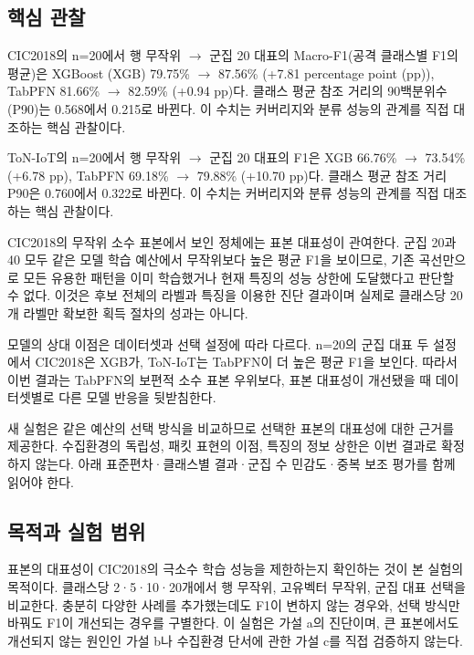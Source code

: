 

\subsection{핵심 관찰}
CIC2018의 n=\allowbreak{}20에서 행 무작위  \ensuremath{\rightarrow}  군집 20 대표의 Macro-F1(공격 클래스별 F1의 평균)은 XGBoost (XGB) 79.75\%  \ensuremath{\rightarrow}  87.56\% (+\allowbreak{}7.81 percentage point (pp)), TabPFN 81.66\%  \ensuremath{\rightarrow}  82.59\% (+\allowbreak{}0.94 pp)다. 클래스 평균 참조 거리의 90백분위수 (P90)는 0.568에서 0.215로 바뀐다. 이 수치는 커버리지와 분류 성능의 관계를 직접 대조하는 핵심 관찰이다.

ToN-IoT의 n=\allowbreak{}20에서 행 무작위  \ensuremath{\rightarrow}  군집 20 대표의 F1은 XGB 66.76\%  \ensuremath{\rightarrow}  73.54\% (+\allowbreak{}6.78 pp), TabPFN 69.18\%  \ensuremath{\rightarrow}  79.88\% (+\allowbreak{}10.70 pp)다. 클래스 평균 참조 거리 P90은 0.760에서 0.322로 바뀐다. 이 수치는 커버리지와 분류 성능의 관계를 직접 대조하는 핵심 관찰이다.

CIC2018의 무작위 소수 표본에서 보인 정체에는 표본 대표성이 관여한다. 군집 20과 40 모두 같은 모델 학습 예산에서 무작위보다 높은 평균 F1을 보이므로, 기존 곡선만으로 모든 유용한 패턴을 이미 학습했거나 현재 특징의 성능 상한에 도달했다고 판단할 수 없다. 이것은 후보 전체의 라벨과 특징을 이용한 진단 결과이며 실제로 클래스당 20개 라벨만 확보한 획득 절차의 성과는 아니다.

모델의 상대 이점은 데이터셋과 선택 설정에 따라 다르다. n=\allowbreak{}20의 군집 대표 두 설정에서 CIC2018은 XGB가, ToN-IoT는 TabPFN이 더 높은 평균 F1을 보인다. 따라서 이번 결과는 TabPFN의 보편적 소수 표본 우위보다, 표본 대표성이 개선됐을 때 데이터셋별로 다른 모델 반응을 뒷받침한다.

새 실험은 같은 예산의 선택 방식을 비교하므로 선택한 표본의 대표성에 대한 근거를 제공한다. 수집환경의 독립성, 패킷 표현의 이점, 특징의 정보 상한은 이번 결과로 확정하지 않는다. 아래 표준편차·클래스별 결과·군집 수 민감도·중복 보조 평가를 함께 읽어야 한다.

\subsection{목적과 실험 범위}
표본의 대표성이 CIC2018의 극소수 학습 성능을 제한하는지 확인하는 것이 본 실험의 목적이다. 클래스당 2·5·10·20개에서 행 무작위, 고유벡터 무작위, 군집 대표 선택을 비교한다. 충분히 다양한 사례를 추가했는데도 F1이 변하지 않는 경우와, 선택 방식만 바꿔도 F1이 개선되는 경우를 구별한다. 이 실험은 가설 a의 진단이며, 큰 표본에서도 개선되지 않는 원인인 가설 b나 수집환경 단서에 관한 가설 c를 직접 검증하지 않는다.

